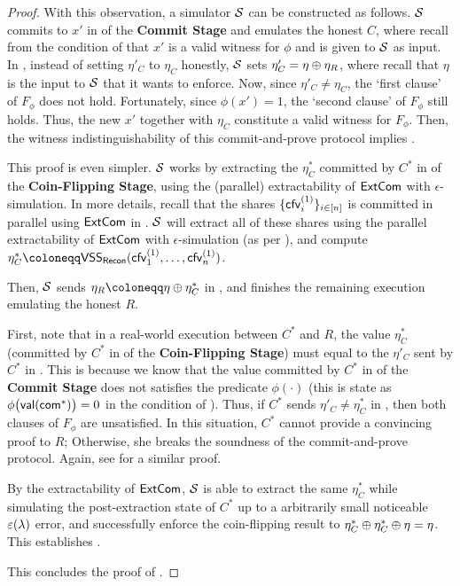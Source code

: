 \begin{proof}
With this observation, a simulator $\mathcal{S}$ can be constructed as follows. $\mathcal{S}$ commits to $x'$ in  of the {\bf Commit Stage} and emulates the honest $C$, where recall from the condition of  that $x'$ is a valid witness for $\phi$ and is given to $\mathcal{S}$ as input. In , instead of setting $\eta'_C$ to $\eta_C$ honestly, $\mathcal{S}$ sets $\eta'_C = \eta \oplus \eta_R$, where recall that $\eta$ is the input to $\mathcal{S}$ that it wants to enforce. Now, since $\eta'_C \ne \eta_C$, the `first clause' of $F_\phi$ does not hold. Fortunately, since $\phi(x') = 1$, the `second clause' of $F_\phi$ still holds. Thus, the new $x'$ together with $\eta_C$ constitute a valid witness for $F_\phi$. Then, the witness indistinguishability of this commit-and-prove protocol implies . 

 This proof is even simpler. $\mathcal{S}$ works by extracting the $\eta^*_C$ committed by $C^*$ in  of the {\bf Coin-Flipping Stage}, using the (parallel) extractability of $\mathsf{ExtCom}$ with $\epsilon$-simulation. In more details, recall that the shares $\{\mathsf{cfv}^{(1)}_i\}_{i \in [n]}$  is committed in parallel using $\mathsf{ExtCom}$ in . $\mathcal{S}$ will extract all of these shares using the parallel extractability of $\mathsf{ExtCom}$ with $\epsilon$-simulation (as per ), and compute $\eta^*_C\coloneqq \VSS_{\Recon}(\msf{cfv}^{(1)}_1, \ldots, \msf{cfv}^{(1)}_n)$.

 Then, $\mathcal{S}$ sends $\eta_R \coloneqq \eta \xor \eta^*_C$ in , and finishes the remaining execution emulating the honest $R$.

First, note that in a real-world execution between $C^*$ and $R$, the value $\eta^*_C$ (committed by $C^*$ in  of the {\bf Coin-Flipping Stage}) must equal to the $\eta'_C$ sent by $C^*$ in . This is because we know that the value committed by $C^*$ in  of the {\bf Commit Stage} does not satisfies the predicate $\phi(\cdot)$ (this is state as $\phi\big(\mathsf{val}(\mathsf{com}^*)\big) = 0$ in the condition of  ). Thus, if $C^*$ sends $\eta'_C \ne \eta^*_C$ in , then both clauses of $F_\phi$ are unsatisfied. In this situation, $C^*$ cannot provide a convincing proof to $R$; Otherwise, she breaks the soundness of the commit-and-prove protocol. Again, see \cite[Section 6.5]{C:CCLY22} for a similar proof.

 By the extractability of $\mathsf{ExtCom}$, $\mathcal{S}$ is able to extract the same $\eta^*_C$ while simulating the post-extraction state of $C^*$ up to a arbitrarily small noticeable $\varepsilon(\lambda)$ error, and successfully enforce the coin-flipping result to $\eta^*_C \oplus \eta^*_C\oplus\eta= \eta$. This establishes .



This concludes the proof of .

\end{proof}



